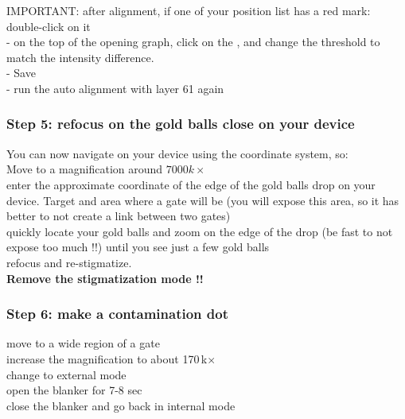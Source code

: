 \documentclass[12pt,a4paper]{report}
\begin{document}
\begin{enumerate}
IMPORTANT: after alignment, if one of your position list has a red mark:\\
double-click on it\\
- on the top of the opening graph, click on the , and change the threshold to match the intensity difference.\\
- Save\\
- run the auto alignment with layer 61 again\\


\subsubsection{Step 5: refocus on the gold balls close on your device}
You can now navigate on your device using the coordinate system, so:\\

Move to a magnification around $7000 k \times$\\

enter the approximate coordinate of the edge of the gold balls drop on your device. Target and area where a gate will be (you will expose this area, so it has better to not create a link between two gates)\\

quickly locate your gold balls and zoom on the edge of the drop (be fast to not expose too much !!) until you see just a few gold balls\\

refocus and re-stigmatize.\\

\textbf{Remove the stigmatization mode !!}\\


\subsubsection{Step 6: make a contamination dot}

move to a wide region of a gate\\

increase the magnification to about 170\,k$\times$\\

change to external mode\\

open the blanker for 7-8 sec\\

close the blanker and go back in internal mode\\


\end{enumerate}
\end{document}
